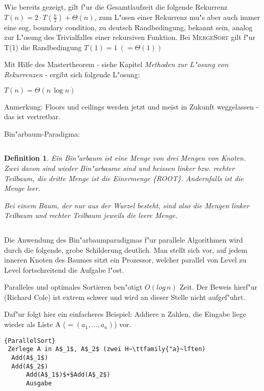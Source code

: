 \documentclass[draft,12pt]{scrreprt}
\theoremstyle{break}
\newtheorem{definition}{Definition}
\begin{document}
Wie bereits gezeigt, gilt f"ur die Gesamtlaufzeit die folgende Rekurrenz $T(n) = 2\cdot T(\frac{n}{2})+\Theta(n)$, zum L"osen einer
Rekurrenz mu"s aber auch immer eine sog. boundary condition, zu deutsch Randbedingung, bekannt sein, analog zur L"osung des Trivialfalles einer rekursiven
Funktion. Bei \textsc{MergeSort} gilt f"ur T(1) die Randbedingung $T(1) = 1\ (=\Theta(1))$

Mit Hilfe des Mastertheorem - siehe Kapitel \textit{Methoden zur L"osung von Rekurrenzen} - ergibt sich folgende L"osung:

$T(n) = \Theta(n\, \log n)$ 

Anmerkung: Floors und ceilings werden jetzt und meist in Zukunft weggelassen - das ist vertretbar.

\begin{description}
	\item [Bin"arbaum-Paradigma:] 
\end{description}
	
$$  $$

\begin{definition}
	  Ein Bin"arbaum ist eine Menge von drei Mengen von Knoten. Zwei davon sind wieder Bin"arbaume sind und heissen linker bzw.
	  rechter Teilbaum, die dritte Menge ist die Einermenge \{ROOT\}. Andernfalls ist die Menge leer.
	  
	  Bei einem Baum, der nur aus der Wurzel besteht, sind also die Mengen linker Teilbaum und rechter Teilbaum jeweils die leere
	  Menge.
\end{definition}

$$  $$

Die Anwendung des Bin"arbaumparadigmas f"ur parallele Algorithmen wird durch die folgende, grobe Schilderung deutlich.
Man stellt sich vor, auf jedem inneren Knoten des Baumes sitzt ein Prozessor, welcher parallel von Level zu Level fortschreitend die
Aufgabe l"ost.

Paralleles und optimales Sortieren ben"otigt $O(log\,n)$ Zeit. Der Beweis hierf"ur (Richard Cole) ist extrem schwer und wird an dieser Stelle nicht aufgef"uhrt.

Daf"ur folgt hier ein einfacheres Beispiel: Addiere n Zahlen, die Eingabe liege wieder als Liste A ($=(a_1,\ldots,a_n)$) vor.

\begin{Algorithmus}[h]
\begin{lstlisting}[frame=tlrb, mathescape=true, title=\textsc{ParallelSort}, gobble=1]{ParallelSort}
 Zerlege A in A$_1$, A$_2$ (zwei H~\ttfamily{"a}~lften)
  Add(A$_1$)
  Add(A$_2$)
      Add(A$_1$)$+$Add(A$_2$)
      Ausgabe
      \end{lstlisting}
  \end{Algorithmus}
\end{document}
